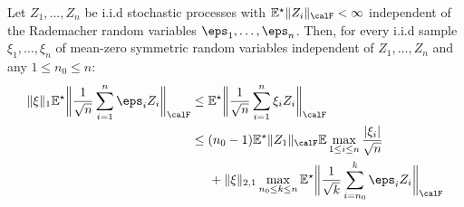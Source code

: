 \begin{lemma}
	\label{lemma:vdv2.9.1}
	Let \(Z_1,\dots,Z_n\) be i.i.d stochastic processes with \(\E^\star\|Z_i\|_\calF<\infty\) independent of the Rademacher random variables \(\eps_1,\dots,\eps_n\). Then, for every i.i.d sample \(\xi_1,\dots,\xi_n\) of mean-zero symmetric random variables independent of \(Z_1,\dots,Z_n\) and any \(1\leq n_0\leq n\):
	\begin{align*}
		\|\xi\|_1\E^\star\bigg\|\frac{1}{\sqrt{n}}\sum_{i=1}^n \eps_iZ_i\bigg\|_\calF 
		&\leq \E^\star\bigg\|\frac{1}{\sqrt{n}}\sum_{i=1}^n \xi_iZ_i\bigg\|_\calF \\
		&\leq (n_0-1)\E^\star\|Z_1\|_\calF\E\max_{1\leq i\leq n}\frac{|\xi_i|}{\sqrt{n}} \\ 
		&\;\;\;\;\;+ \|\xi\|_{2,1}\max_{n_0\leq k\leq n}\E^\star\bigg\|\frac{1}{\sqrt{k}}\sum_{i=n_0}^k\eps_iZ_i \bigg\|_\calF 
	\end{align*}
\end{lemma}

